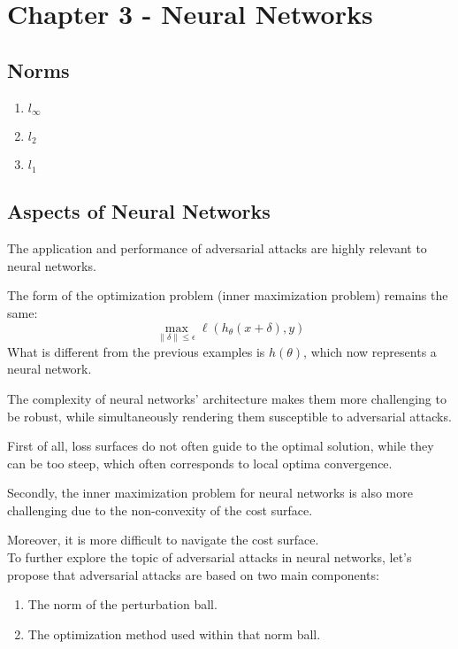 \section{Chapter 3 - Neural Networks}

\subsection{Norms}
\begin{enumerate}
    \item $l_{\infty}$
    \item $l_2$
    \item $l_1$
\end{enumerate}


\subsection{Aspects of Neural Networks}

The application and performance of adversarial attacks are highly relevant to neural networks.

The form of the optimization problem (inner maximization problem) remains the same:
\[\max_{\|\delta\|\leq\epsilon} \ell(h_{\theta}(x + \delta), y)\]    
What is different from the previous examples is $h(\theta)$, which now represents a neural network.

The complexity of neural networks' architecture makes them more challenging to be robust, while simultaneously rendering them susceptible to adversarial attacks.

First of all, loss surfaces do not often guide to the optimal solution, while they can be too steep, which often corresponds to local optima convergence.

Secondly, the inner maximization problem for neural networks is also more challenging due to the non-convexity of the cost surface.

Moreover, it is more difficult to navigate the cost surface.\\

To further explore the topic of adversarial attacks in neural networks, let's propose that adversarial attacks are based on two main components:

\begin{enumerate}
\item The norm of the perturbation ball.
\item The optimization method used within that norm ball.\\
\end{enumerate}

